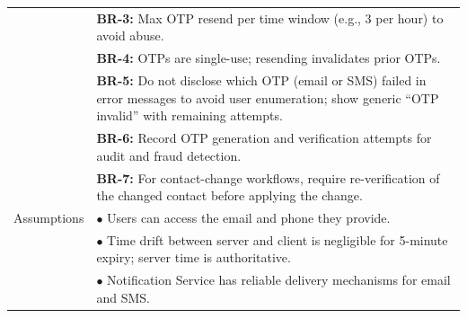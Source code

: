 \begin{longtable}{|>{\raggedright\arraybackslash}p{4cm}|>{\raggedright\arraybackslash}p{11cm}|}
& \textbf{BR-3:} Max OTP resend per time window (e.g., 3 per hour) to avoid abuse. \\
& \textbf{BR-4:} OTPs are single-use; resending invalidates prior OTPs. \\
& \textbf{BR-5:} Do not disclose which OTP (email or SMS) failed in error messages to avoid user enumeration; show generic ``OTP invalid'' with remaining attempts. \\
& \textbf{BR-6:} Record OTP generation and verification attempts for audit and fraud detection. \\
& \textbf{BR-7:} For contact-change workflows, require re-verification of the changed contact before applying the change. \\
\hline
Assumptions & $\bullet$ Users can access the email and phone they provide. \\
& $\bullet$ Time drift between server and client is negligible for 5-minute expiry; server time is authoritative. \\
& $\bullet$ Notification Service has reliable delivery mechanisms for email and SMS. \\
\end{longtable}

